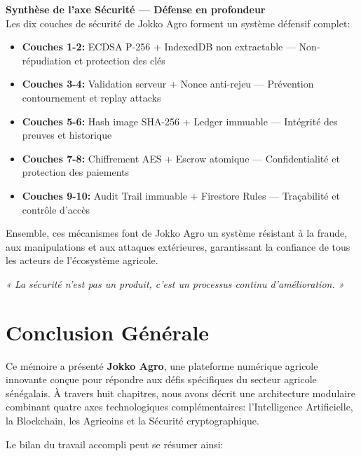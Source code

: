 \documentclass[12pt,a4paper]{report}
\begin{document}
\begin{tcolorbox}[synthbox]
  \textbf{Synthèse de l'axe Sécurité --- Défense en profondeur}\\[6pt]
  Les dix couches de sécurité de Jokko Agro forment un système défensif complet:
  \begin{itemize}[leftmargin=*,itemsep=2pt]
    \item \textbf{Couches 1-2:} ECDSA P-256 + IndexedDB non extractable --- Non-répudiation et protection des clés
    \item \textbf{Couches 3-4:} Validation serveur + Nonce anti-rejeu --- Prévention contournement et replay attacks
    \item \textbf{Couches 5-6:} Hash image SHA-256 + Ledger immuable --- Intégrité des preuves et historique
    \item \textbf{Couches 7-8:} Chiffrement AES + Escrow atomique --- Confidentialité et protection des paiements
    \item \textbf{Couches 9-10:} Audit Trail immuable + Firestore Rules --- Traçabilité et contrôle d'accès
  \end{itemize}
  Ensemble, ces mécanismes font de Jokko Agro un système résistant à la fraude, aux manipulations
  et aux attaques extérieures, garantissant la confiance de tous les acteurs de l'écosystème agricole.
\end{tcolorbox}

\vspace{0.5cm}
\begin{flushright}
  \textit{« La sécurité n'est pas un produit, c'est un processus continu d'amélioration. »}
\end{flushright}
\chapter*{Conclusion Générale}

\noindent
Ce mémoire a présenté \textbf{Jokko Agro}, une plateforme numérique agricole innovante
conçue pour répondre aux défis spécifiques du secteur agricole sénégalais. À travers huit
chapitres, nous avons décrit une architecture modulaire combinant quatre axes
technologiques complémentaires: l'Intelligence Artificielle, la Blockchain, les Agricoins
et la Sécurité cryptographique.

\vspace{0.4cm}

\noindent
Le bilan du travail accompli peut se résumer ainsi:
\end{document}
